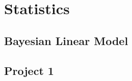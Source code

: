\documentclass[
]{book}
\begin{document}
\newcommand\ualpha{{\boldsymbol \alpha}}
\newcommand{\ubeta}{{\boldsymbol \beta}} 
\newcommand{\bg}{{\boldsymbol \gamma}}
\newcommand{\bG}{{\boldsymbol \Gamma}}
\newcommand{\udelta}{{\boldsymbol \delta}}
\newcommand{\uDelta}{{\boldsymbol \Delta}}
\newcommand{\uepsilon}{{\boldsymbol \epsilon}}
\newcommand{\uvarepsilon}{{\boldsymbol \varepsilon}}
\newcommand{\uzeta}{{\boldsymbol \zeta}}
\newcommand{\ueta}{{\boldsymbol \eta}} 
\newcommand{\utheta}{{\boldsymbol \theta}}
\newcommand{\uvartheta}{{\boldsymbol \vartheta}}
\newcommand{\uTheta}{{\boldsymbol \Theta}}
\newcommand{\uiota}{{\boldsymbol \iota}}
\newcommand{\ukappa}{{\boldsymbol \kappa}}
\newcommand{\ulambda}{{\boldsymbol \lambda}}
\newcommand{\uLambda}{{\boldsymbol \Lambda}}
\newcommand{\umu}{{\boldsymbol \mu}} 
\newcommand{\unu}{{\boldsymbol \nu}}
\newcommand{\uxi}{{\boldsymbol \xi}}
\newcommand{\uXi}{{\boldsymbol \Xi}}
\newcommand{\uomicron}{{\boldsymbol \omicron}}
\newcommand{\uOmicron}{{\boldsymbol \Omicron}}
\newcommand{\upi}{{\boldsymbol \pi}}
\newcommand{\uPi}{{\boldsymbol \Pi}}
\newcommand{\urho}{{\boldsymbol \rho}}
\newcommand{\uvarrho}{{\boldsymbol \varrho}}
\newcommand{\usigma}{{\boldsymbol \sigma}}
\newcommand{\uSigma}{{\boldsymbol \Sigma}}
\newcommand{\utau}{{\boldsymbol \tau}}
\newcommand{\uupsilon}{{\boldsymbol \upsilon}}
\newcommand{\uUpsilon}{{\boldsymbol \Upsilon}}
\newcommand{\uphi}{{\boldsymbol \phi}}
\newcommand{\uvarphi}{{\boldsymbol \varphi}}
\newcommand{\uPhi}{{\boldsymbol \Phi}}
\newcommand{\uchi}{{\boldsymbol \chi}}
\newcommand{\upsi}{{\boldsymbol \psi}}
\newcommand{\uPsi}{{\boldsymbol \Psi}}
\newcommand{\uomega}{{\boldsymbol\omega}}
\newcommand{\uOmega}{{\boldsymbol\Omega}}

\newcommand{\0}{{\boldsymbol 0}} 
\newcommand{\1}{{\boldsymbol 1}} 
\newcommand{\T}{{ \top}} 
\newcommand{\diag}{{\rm diag}}

\newcommand\nbd{{\rm nbd}}

\hypertarget{stats}{%
\chapter{Statistics}\label{stats}}

\hypertarget{bayesian-linear-model}{%
\section{Bayesian Linear Model}\label{bayesian-linear-model}}

\hypertarget{project-1}{%
\section{Project 1}\label{project-1}}
\end{document}

